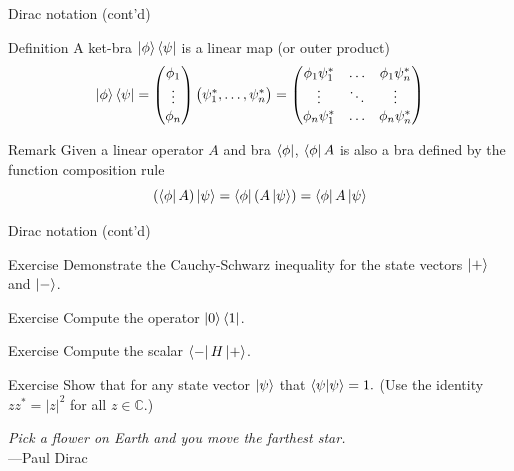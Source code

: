 \documentclass{beamer}
\newcommand{\C}{\mathbb{C}}
\begin{document}
\begin{frame}{Dirac notation (cont'd)}
    
\begin{block}{Definition}
A ket-bra $ \ket{\phi}\bra\psi $ is a linear map (or outer product)
$$
 \ket{\phi} \bra{\psi} = 
    \begin{pmatrix}
        \phi_1 \\
        \vdots \\
        \phi_n
    \end{pmatrix}
    \begin{pmatrix}
        \psi_1^*, \ldots,\psi_n^*
    \end{pmatrix} =
    \begin{pmatrix}
            \phi_1\psi_1^* & \ldots & \phi_1\psi_n^* \\
            \vdots & \ddots & \vdots \\
            \phi_n\psi_1^* & \ldots & \phi_n\psi_n^*
    \end{pmatrix}
$$
\end{block}

\begin{block}{Remark}
    Given a linear operator $A$ and bra $\bra\phi$, $\bra\phi A$ is also a bra defined by the function composition rule $$ (\bra\phi A) \ket\psi = \bra\phi (A\ket\psi) = \bra\phi A \ket\psi $$
\end{block}
\end{frame}

\begin{frame}{Dirac notation (cont'd)}
    \begin{block}{Exercise}
        Demonstrate the Cauchy-Schwarz inequality for the state vectors $\ket +$ and $\ket -$.
    \end{block}
    \begin{block}{Exercise}
        Compute the operator $\ket 0 \bra 1$.
    \end{block}
    \begin{block}{Exercise}
        Compute the scalar $\bra - H \ket +$.
    \end{block}
    \begin{block}{Exercise}
        Show that for any state vector $\ket\psi$ that $\braket{\psi | \psi} = 1.$ (Use the identity $zz^* = |z|^2$ for all $z\in \C.$)
    \end{block}
    \begin{flushright}
        \textit{Pick a flower on Earth and you move the farthest star.}\\---Paul Dirac
    \end{flushright}
\end{frame}
\end{document}
